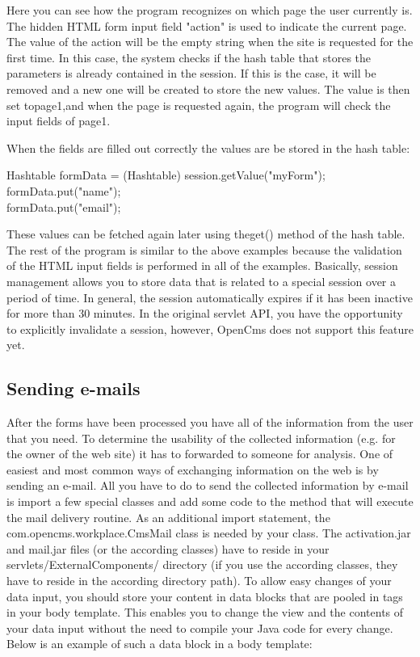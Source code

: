 Here you can see how the program recognizes on which page the user
currently is. The hidden HTML form input field "action" is used to
indicate the current page. The value of the action will be the empty
string when the site is requested for the first time. In this case, the
system checks if the hash table that stores the parameters is already
contained in the session. If this is  the case, it will be removed and a
new one will be created to store the new values. The value is then set
to{\name page1,}and when the page is requested again, the program will check
the input fields of page1.

When the fields are filled out correctly the values are be stored in the
hash table:
\begin{java}
Hashtable formData = (Hashtable) session.getValue("myForm");\\
formData.put("name");\\
formData.put("email");\\
\end{java}


These values can be fetched again later using the{\meth  get()} method of the
hash table. The rest of the program is similar to the above examples
because the validation of the HTML input fields is performed in all of
the examples.
Basically, session management allows you to store data that is related
to a special session over a period of time. In general, the session
automatically expires if it has been inactive for more than 30 minutes.
In the original servlet API, you have the opportunity to explicitly
invalidate a session, however, OpenCms does not support this feature yet.

\subsection{Sending e-mails}
After the forms have been processed you have all of the information from
the user that you need. To determine the usability of the collected
information (e.g. for the owner of the web site) it has to forwarded to
someone for analysis. One of easiest and most common ways of exchanging
information on the web is by sending an e-mail. All you have to do to
send the collected information by e-mail is import a few special classes
and add some code to the method that will execute the mail delivery
routine. As an additional import statement, the
com.opencms.workplace.{\class CmsMail} class is needed by your class. The
{\name activation.jar} and {\name mail.jar} files 
(or the according classes) have to
reside in your {\dir servlets/ExternalComponents/} directory (if you use the
according classes, they have to reside in the according directory path).
To allow easy changes of your data input, you should store your content
in data blocks that are pooled in tags in your body template. This
enables you to change the view and the contents of your data input
without the need to compile your Java code for every change. Below is
an example of such a data block in a body template:

